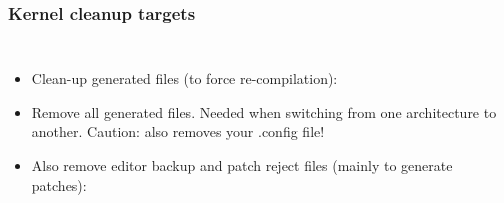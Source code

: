 \begin{frame}
  \frametitle{Kernel cleanup targets}
  \begin{columns}
    \begin{itemize}
    \item Clean-up generated files (to force re-compilation):\\
    \item Remove all generated files. Needed when switching from one
      architecture to another. Caution: also removes your .config file!\\
    \item Also remove editor backup and patch reject files (mainly to
      generate patches):\\
    \end{itemize}

\end{columns}
\end{frame}

